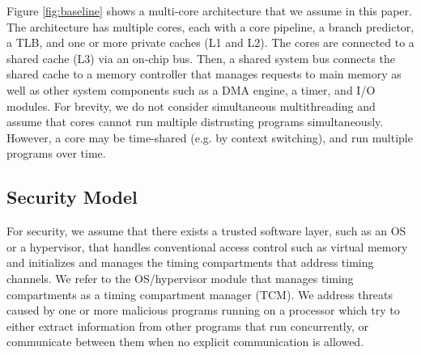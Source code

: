 Figure \ref{fig:baseline} shows a multi-core architecture that we assume
in this paper.
The architecture
has multiple cores, each with a core pipeline, a branch predictor, a TLB,
and one or more private caches (L1 and L2). 
The cores are connected to a shared cache (L3) via an on-chip bus. Then, a shared system 
bus connects the shared cache to a memory controller that manages requests to 
main memory as well as other system components such as a DMA engine, a timer, and I/O
modules.
For brevity, we do not consider simultaneous multithreading and assume that
cores cannot run multiple distrusting programs simultaneously.
However, a core may be time-shared (e.g. by context switching), and run multiple
programs over time.




\subsection{Security Model}

For security,
we assume that there exists a trusted software layer, such as an OS or a 
hypervisor, 
that handles conventional access control such as virtual memory and initializes 
and manages the timing compartments that address timing channels.
We refer to the OS/hypervisor module that manages timing compartments as
a timing compartment manager (TCM).
We address threats caused by one or more malicious programs running on a processor
which try to either extract information from other programs that run
concurrently, or communicate between them when no explicit communication is allowed. 

